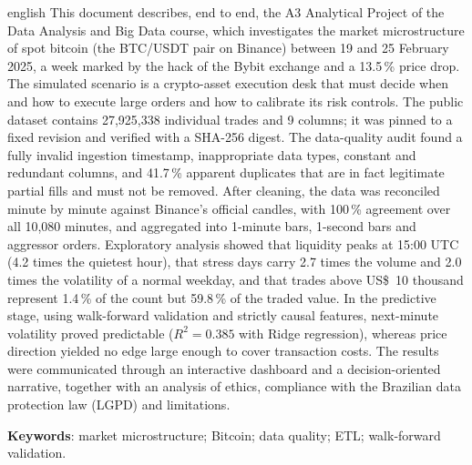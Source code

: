 \documentclass[
  12pt,
  openany,
  oneside,
  a4paper,
  chapter=TITLE,
  section=TITLE,
  english,
  brazil,
  sumario=tradicional
]{abntex2}
\begin{document}
\begin{resumo}[Abstract]
\begin{otherlanguage*}{english}
This document describes, end to end, the A3 Analytical Project of the Data
Analysis and Big Data course, which investigates the market microstructure of
spot bitcoin (the BTC/USDT pair on Binance) between 19 and 25 February 2025, a
week marked by the hack of the Bybit exchange and a 13.5\,\% price drop. The
simulated scenario is a crypto-asset execution desk that must decide when and
how to execute large orders and how to calibrate its risk controls. The public
dataset contains 27,925,338 individual trades and 9 columns; it was pinned to a
fixed revision and verified with a SHA-256 digest. The data-quality audit found
a fully invalid ingestion timestamp, inappropriate data types, constant and
redundant columns, and 41.7\,\% apparent duplicates that are in fact legitimate
partial fills and must not be removed. After cleaning, the data was reconciled
minute by minute against Binance's official candles, with 100\,\% agreement over
all 10,080 minutes, and aggregated into 1-minute bars, 1-second bars and
aggressor orders. Exploratory analysis showed that liquidity peaks at 15:00 UTC
(4.2 times the quietest hour), that stress days carry 2.7 times the volume and
2.0 times the volatility of a normal weekday, and that trades above US\$~10
thousand represent 1.4\,\% of the count but 59.8\,\% of the traded value. In the
predictive stage, using walk-forward validation and strictly causal features,
next-minute volatility proved predictable ($R^2 = 0.385$ with Ridge
regression), whereas price direction yielded no edge large enough to cover
transaction costs. The results were communicated through an interactive
dashboard and a decision-oriented narrative, together with an analysis of
ethics, compliance with the Brazilian data protection law (LGPD) and
limitations.

\vspace{\onelineskip}
\noindent\textbf{Keywords}: market microstructure; Bitcoin; data quality; ETL;
walk-forward validation.
\end{otherlanguage*}
\end{resumo}

\listoffigures*
\cleardoublepage
\end{document}
